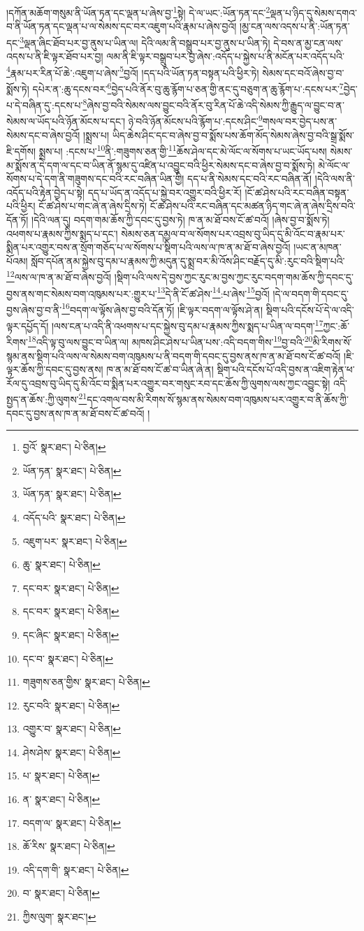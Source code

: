 །དཀོན་མཆོག་གསུམ་ནི་ཡོན་ཏན་དང་ལྡན་པ་ཞེས་བྱ་\footnote{བྱའོ་  སྣར་ཐང་།  པེ་ཅིན། }སྟེ། དེ་ལ་ཡང་:ཡོན་ཏན་དང་\footnote{ཡོན་ཏན་  སྣར་ཐང་།  པེ་ཅིན། }ལྡན་པ་ཉིད་དུ་སེམས་དགའ་བ་ནི་ཡོན་ཏན་དང་ལྡན་པ་ལ་སེམས་དང་བར་འཇུག་པའི་རྣམ་པ་ཞེས་བྱའོ། །མྱ་ངན་ལས་འདས་པ་ནི་:ཡོན་ཏན་དང་\footnote{ཡོན་ཏན་  སྣར་ཐང་།  པེ་ཅིན། }ལྡན་ཞིང་ཐོབ་པར་བྱ་ནུས་པ་ཡིན་ལ། དེའི་ལམ་ནི་བསྒྲུབ་པར་བྱ་ནུས་པ་ཡིན་ཏེ། དེ་བས་ན་མྱ་ངན་ལས་འདས་པ་ནི་ཇི་ལྟར་ཐོབ་པར་བྱ། ལམ་ནི་ཇི་ལྟར་བསྒྲུབ་པར་བྱ་ཞེས་:འདོད་པ་སྐྱེས་པ་ནི་མངོན་པར་འདོད་པའི་\footnote{འདོད་པའི་  སྣར་ཐང་།  པེ་ཅིན། }རྣམ་པར་རིན་པོ་ཆེ་:འཇུག་པ་ཞེས་\footnote{འཇུག་པར་  སྣར་ཐང་།  པེ་ཅིན། }བྱའོ། །དད་པའི་ཡོན་ཏན་བསྟན་པའི་ཕྱིར་ཏེ། སེམས་དང་བའོ་ཞེས་བྱ་བ་སྨོས་ཏེ། དཔེར་ན་:ཆུ་དངས་བར་\footnote{ཆུ་  སྣར་ཐང་།  པེ་ཅིན། }བྱེད་པའི་ནོར་བུ་ཆུ་རྙོག་པ་ཅན་གྱི་ནང་དུ་བཅུག་ན་ཆུ་རྙོག་པ་:དངས་པར་\footnote{དང་བར་  སྣར་ཐང་།  པེ་ཅིན། }བྱེད་པ་དེ་བཞིན་དུ་:དངས་པ་\footnote{དང་བར་  སྣར་ཐང་།  པེ་ཅིན། }ཞེས་བྱ་བའི་སེམས་ལས་བྱུང་བའི་ནོར་བུ་རིན་པོ་ཆེ་འདི་སེམས་ཀྱི་རྒྱུད་ལ་བྱུང་བ་ན་སེམས་ལ་ཡོད་པའི་ཉོན་མོངས་པ་དང་། ཉེ་བའི་ཉོན་མོངས་པའི་རྙོག་པ་:དངས་ཤིང་\footnote{དང་ཞིང་  སྣར་ཐང་།  པེ་ཅིན། }གསལ་བར་བྱེད་པས་ན་སེམས་དང་བ་ཞེས་བྱའོ། །སྨྲས་པ། ཡིད་ཆེས་ཤིང་དང་བ་ཞེས་བྱ་བ་སྨོས་པས་ཆོག་མོད་སེམས་ཞེས་བྱ་བའི་སྒྲ་སྨོས་ཇི་དགོས། སྨྲས་པ། :དངས་པ་\footnote{དང་བ་  སྣར་ཐང་།  པེ་ཅིན། }ནི་:གཟུགས་ཅན་གྱི་\footnote{གཟུགས་ཅན་གྱིས་  སྣར་ཐང་།  པེ་ཅིན། }ཆོས་ཤེལ་དང་མེ་ལོང་ལ་སོགས་པ་ཡང་ཡོད་པས། སེམས་མ་སྨོས་ན་དེ་དག་ལ་དང་བ་ཡིན་ནོ་སྙམ་དུ་འཛིན་པ་འབྱུང་བའི་ཕྱིར་སེམས་དང་བ་ཞེས་བྱ་བ་སྨོས་ཏེ། མེ་ལོང་ལ་སོགས་པ་དེ་དག་ནི་གཟུགས་དང་བའི་རང་བཞིན་ཡིན་གྱི། དད་པ་ནི་སེམས་དང་བའི་རང་བཞིན་ནོ། །དེའི་ལས་ནི་འདོད་པའི་རྟེན་བྱེད་པ་སྟེ། དད་པ་ཡོད་ན་འདོད་པ་སྐྱེ་བར་འགྱུར་བའི་ཕྱིར་རོ། །ངོ་ཚ་ཤེས་པའི་རང་བཞིན་བསྟན་པའི་ཕྱིར། ངོ་ཚ་ཤེས་པ་གང་ཞེ་ན་ཞེས་དྲིས་ཏེ། ངོ་ཚ་ཤེས་པའི་རང་བཞིན་དང་མཚན་ཉིད་གང་ཞེ་ན་ཞེས་དྲིས་བའི་དོན་ཏོ། །དེའི་ལན་དུ། བདག་གམ་ཆོས་ཀྱི་དབང་དུ་བྱས་ཏེ། ཁ་ན་མ་ཐོ་བས་ངོ་ཚ་བའོ། །ཞེས་བྱ་བ་སྨོས་ཏེ། འཕགས་པ་རྣམས་ཀྱིས་སྨད་པ་དང་། སེམས་ཅན་དམྱལ་བ་ལ་སོགས་པར་འབྲས་བུ་ཡིད་དུ་མི་འོང་བ་རྣམ་པར་སྨིན་པར་འགྱུར་བས་ན་སྲོག་གཅོད་པ་ལ་སོགས་པ་སྡིག་པའི་ལས་ལ་ཁ་ན་མ་ཐོ་བ་ཞེས་བྱའོ། །ཡང་ན་མཁན་པོའམ། སློབ་དཔོན་ནམ་སྐྱེས་བུ་དམ་པ་རྣམས་ཀྱི་མདུན་དུ་སྨྲ་བར་མི་འོས་ཤིང་བརྗོད་དུ་མི་:རུང་བའི་སྡིག་པའི་\footnote{རུང་བའི་  སྣར་ཐང་།  པེ་ཅིན། }ལས་ལ་ཁ་ན་མ་ཐོ་བ་ཞེས་བྱའོ། །སྡིག་པའི་ལས་དེ་བྱས་ཀྱང་རུང་མ་བྱས་ཀྱང་རུང་བདག་གམ་ཆོས་ཀྱི་དབང་དུ་བྱས་ནས་གང་སེམས་བག་འཁུམས་པར་:གྱུར་པ་\footnote{འགྱུར་བ་  སྣར་ཐང་།  པེ་ཅིན། }དེ་ནི་ངོ་ཚ་ཤེས་\footnote{ཤེས་ཤེས་  སྣར་ཐང་།  པེ་ཅིན། }:པ་ཞེས་\footnote{པ་  སྣར་ཐང་།  པེ་ཅིན། }བྱའོ། །དེ་ལ་བདག་གི་དབང་དུ་བྱས་ཞེས་བྱ་བ་ནི་\footnote{ན་  སྣར་ཐང་།  པེ་ཅིན། }བདག་ལ་ལྟོས་ཞེས་བྱ་བའི་དོན་ཏོ། །ཇི་ལྟར་བདག་ལ་ལྟོས་ཤེ་ན། སྡིག་པའི་དངོས་པོ་དེ་ལ་འདི་ལྟར་དཔྱོད་དོ། །ལས་ངན་པ་འདི་ནི་འཕགས་པ་དང་སྐྱེས་བུ་དམ་པ་རྣམས་ཀྱིས་སྨད་པ་ཡིན་ལ་བདག་\footnote{བདག་ལ་  སྣར་ཐང་།  པེ་ཅིན། }ཀྱང་:ཆོ་རིགས་\footnote{ཆོ་རིས་  སྣར་ཐང་།  པེ་ཅིན། }འདི་ལྟ་བུ་ལས་བྱུང་བ་ཡིན་ལ། མཁས་ཤིང་ཤེས་པ་ཡིན་པས་:འདི་བདག་གིས་\footnote{འདི་དག་གི་  སྣར་ཐང་།  པེ་ཅིན། }བྱ་བའི་\footnote{བ་  སྣར་ཐང་།  པེ་ཅིན། }མི་རིགས་སོ་སྙམ་ནས་སྡིག་པའི་ལས་ལ་སེམས་བག་འཁུམས་པ་ནི་བདག་གི་དབང་དུ་བྱས་ནས་ཁ་ན་མ་ཐོ་བས་ངོ་ཚ་བའོ། །ཇི་ལྟར་ཆོས་ཀྱི་དབང་དུ་བྱས་ནས། ཁ་ན་མ་ཐོ་བས་ངོ་ཚ་བ་ཡིན་ཞེ་ན། སྡིག་པའི་དངོས་པོ་འདི་བྱས་ན་འཇིག་རྟེན་ཕ་རོལ་དུ་འབྲས་བུ་ཡིད་དུ་མི་འོང་བ་སྨིན་པར་འགྱུར་བར་གསུང་རབ་དང་ཆོས་ཀྱི་ལུགས་ལས་ཀྱང་འབྱུང་སྟེ། འདི་སྤྱད་ན་ཆོས་:ཀྱི་ལུགས་\footnote{ཀྱིས་ལུག་  སྣར་ཐང་། }དང་འགལ་བས་མི་རིགས་སོ་སྙམ་ནས་སེམས་བག་འཁུམས་པར་འགྱུར་བ་ནི་ཆོས་ཀྱི་དབང་དུ་བྱས་ནས་ཁ་ན་མ་ཐོ་བས་ངོ་ཚ་བའོ། །

